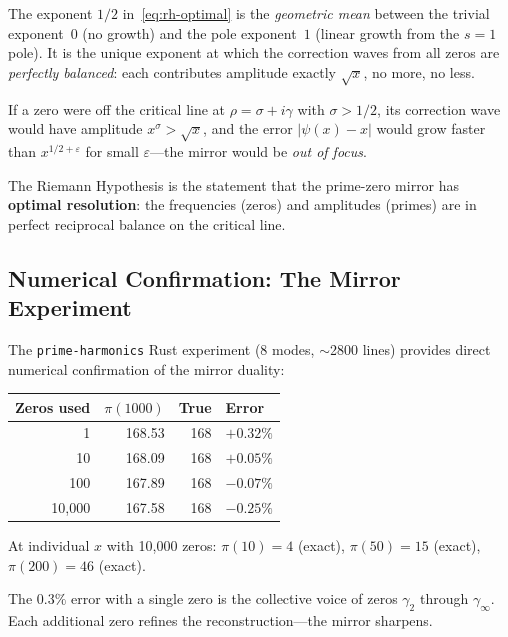 \begin{principle}[RH = Perfect Amplitude Balance]
\label{princ:amplitude-balance}
The exponent $1/2$ in~\eqref{eq:rh-optimal} is the \emph{geometric mean}
between the trivial exponent~$0$ (no growth) and the pole exponent~$1$
(linear growth from the $s = 1$ pole). It is the unique exponent at
which the correction waves from all zeros are \emph{perfectly balanced}:
each contributes amplitude exactly $\sqrt{x}$, no more, no less.

If a zero were off the critical line at $\rho = \sigma + i\gamma$
with $\sigma > 1/2$, its correction wave would have amplitude
$x^\sigma > \sqrt{x}$, and the error $|\psi(x) - x|$ would grow
faster than $x^{1/2+\varepsilon}$ for small $\varepsilon$---the
mirror would be \emph{out of focus}.

The Riemann Hypothesis is the statement that the prime-zero mirror
has \textbf{optimal resolution}: the frequencies (zeros) and amplitudes
(primes) are in perfect reciprocal balance on the critical line.
\end{principle}

\subsection{Numerical Confirmation: The Mirror Experiment}

The \texttt{prime-harmonics} Rust experiment (8 modes, $\sim$2800 lines)
provides direct numerical confirmation of the mirror duality:

\begin{center}
\small
\begin{tabular}{@{}rrrl@{}}
\toprule
\textbf{Zeros used} & \textbf{$\pi(1000)$} & \textbf{True} & \textbf{Error} \\
\midrule
1     & 168.53 & 168 & $+0.32\%$ \\
10    & 168.09 & 168 & $+0.05\%$ \\
100   & 167.89 & 168 & $-0.07\%$ \\
10{,}000 & 167.58 & 168 & $-0.25\%$ \\
\bottomrule
\end{tabular}
\end{center}

At individual $x$ with 10{,}000 zeros:
$\pi(10) = 4$ (exact), $\pi(50) = 15$ (exact),
$\pi(200) = 46$ (exact).

The $0.3\%$ error with a single zero is the collective voice of
zeros $\gamma_2$ through $\gamma_\infty$. Each additional zero
refines the reconstruction---the mirror sharpens.

